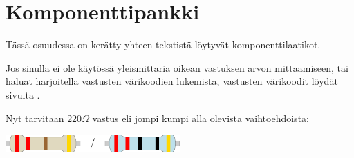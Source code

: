 \chapter{Komponenttipankki}
Tässä osuudessa on kerätty yhteen tekstistä löytyvät komponenttilaatikot. 

\begin{tcolorbox}[title=Vastuksen arvo]
Jos sinulla ei ole käytössä yleismittaria oikean vastuksen arvon mittaamiseen, tai haluat harjoitella vastusten värikoodien lukemista, vastusten värikoodit löydät sivulta \pageref{varikoodit}.

Nyt tarvitaan $220\Omega$ vastus eli jompi kumpi alla olevista vaihtoehdoista:

\begin{center}
\includegraphics[width=0.5\textwidth]{kuvat/220.pdf}
\end{center}
\end{tcolorbox}

